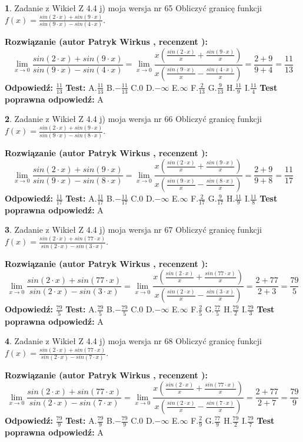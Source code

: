 \documentclass[12pt, a4paper]{article}
\theoremstyle{definition} %
\newtheorem{zad}{}
\newcommand{\zadStart}[1]{\begin{zad}#1\newline}
\newcommand{\zadStop}{\end{zad}}
\newcommand{\rozwStart}[2]{\noindent \textbf{Rozwiązanie (autor #1 , recenzent #2): }\newline}
\newcommand{\rozwStop}{\newline}
\newcommand{\odpStart}{\noindent \textbf{Odpowiedź:}\newline}
\newcommand{\odpStop}{\newline}
\newcommand{\testStart}{\noindent \textbf{Test:}\newline}
\newcommand{\testStop}{\newline}
\newcommand{\kluczStart}{\noindent \textbf{Test poprawna odpowiedź:}\newline}
\newcommand{\kluczStop}{\newline}
\begin{document}
\zadStart{Zadanie z Wikieł Z 4.4 j) moja wersja nr 65}
Obliczyć granicę funkcji $f(x)=\frac{sin(2\cdot x) +sin(9\cdot x)}{sin(9\cdot x) -sin(4\cdot x)}$.
\zadStop
\rozwStart{Patryk Wirkus}{}
$$\lim\limits_{x\to 0}\frac{sin(2\cdot x) +sin(9\cdot x)}{sin(9\cdot x) -sin(4\cdot x)}=\lim\limits_{x\to 0}\frac{x(\frac{sin(2\cdot x)}{x}+\frac{sin(9\cdot x)}{x})}{x(\frac{sin(9\cdot x)}{x}-\frac{sin(4\cdot x)}{x})}=\frac{2+9}{9+4} = \frac{11}{13}$$
\rozwStop
\odpStart
$\frac{11}{13}$
\odpStop
\testStart
A.$\frac{11}{13}$
B.$-\frac{11}{13}$
C.$0$
D.$-\infty$
E.$\infty$
F.$\frac{2}{13}$
G.$\frac{9}{13}$
H.$\frac{11}{9}$
I.$\frac{11}{4}$
\testStop
\kluczStart
A
\kluczStop



\zadStart{Zadanie z Wikieł Z 4.4 j) moja wersja nr 66}
Obliczyć granicę funkcji $f(x)=\frac{sin(2\cdot x) +sin(9\cdot x)}{sin(9\cdot x) -sin(8\cdot x)}$.
\zadStop
\rozwStart{Patryk Wirkus}{}
$$\lim\limits_{x\to 0}\frac{sin(2\cdot x) +sin(9\cdot x)}{sin(9\cdot x) -sin(8\cdot x)}=\lim\limits_{x\to 0}\frac{x(\frac{sin(2\cdot x)}{x}+\frac{sin(9\cdot x)}{x})}{x(\frac{sin(9\cdot x)}{x}-\frac{sin(8\cdot x)}{x})}=\frac{2+9}{9+8} = \frac{11}{17}$$
\rozwStop
\odpStart
$\frac{11}{17}$
\odpStop
\testStart
A.$\frac{11}{17}$
B.$-\frac{11}{17}$
C.$0$
D.$-\infty$
E.$\infty$
F.$\frac{2}{17}$
G.$\frac{9}{17}$
H.$\frac{11}{9}$
I.$\frac{11}{8}$
\testStop
\kluczStart
A
\kluczStop



\zadStart{Zadanie z Wikieł Z 4.4 j) moja wersja nr 67}
Obliczyć granicę funkcji $f(x)=\frac{sin(2\cdot x) +sin(77\cdot x)}{sin(2\cdot x) -sin(3\cdot x)}$.
\zadStop
\rozwStart{Patryk Wirkus}{}
$$\lim\limits_{x\to 0}\frac{sin(2\cdot x) +sin(77\cdot x)}{sin(2\cdot x) -sin(3\cdot x)}=\lim\limits_{x\to 0}\frac{x(\frac{sin(2\cdot x)}{x}+\frac{sin(77\cdot x)}{x})}{x(\frac{sin(2\cdot x)}{x}-\frac{sin(3\cdot x)}{x})}=\frac{2+77}{2+3} = \frac{79}{5}$$
\rozwStop
\odpStart
$\frac{79}{5}$
\odpStop
\testStart
A.$\frac{79}{5}$
B.$-\frac{79}{5}$
C.$0$
D.$-\infty$
E.$\infty$
F.$\frac{2}{5}$
G.$\frac{77}{5}$
H.$\frac{79}{2}$
I.$\frac{79}{3}$
\testStop
\kluczStart
A
\kluczStop



\zadStart{Zadanie z Wikieł Z 4.4 j) moja wersja nr 68}
Obliczyć granicę funkcji $f(x)=\frac{sin(2\cdot x) +sin(77\cdot x)}{sin(2\cdot x) -sin(7\cdot x)}$.
\zadStop
\rozwStart{Patryk Wirkus}{}
$$\lim\limits_{x\to 0}\frac{sin(2\cdot x) +sin(77\cdot x)}{sin(2\cdot x) -sin(7\cdot x)}=\lim\limits_{x\to 0}\frac{x(\frac{sin(2\cdot x)}{x}+\frac{sin(77\cdot x)}{x})}{x(\frac{sin(2\cdot x)}{x}-\frac{sin(7\cdot x)}{x})}=\frac{2+77}{2+7} = \frac{79}{9}$$
\rozwStop
\odpStart
$\frac{79}{9}$
\odpStop
\testStart
A.$\frac{79}{9}$
B.$-\frac{79}{9}$
C.$0$
D.$-\infty$
E.$\infty$
F.$\frac{2}{9}$
G.$\frac{77}{9}$
H.$\frac{79}{2}$
I.$\frac{79}{7}$
\testStop
\kluczStart
A
\kluczStop
\end{document}
